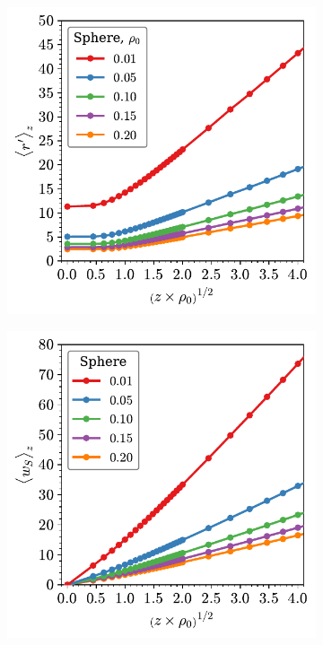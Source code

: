 \begin{figure}

	\begin{subfigure}[b]{0.48\textwidth}
         \centering
         \includegraphics[width=\textwidth]{./figures/quasi2d/d_z_3d_sphere.pdf}
         \caption{}
         \label{fig:wda}
     \end{subfigure}
     \hfill
	\begin{subfigure}[b]{0.48\textwidth}
         \centering
         \includegraphics[width=\textwidth]{./figures/quasi2d/w_z_3d_sphere.pdf}
         \caption{}
         \label{fig:wdb}
     \end{subfigure}
     \hfill     
     

\end{figure}
